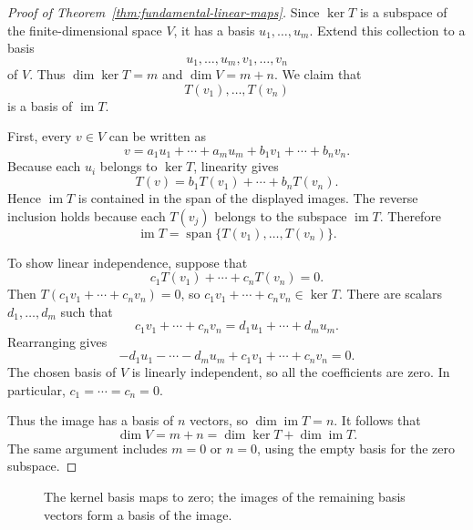 \begin{proof}[Proof of Theorem~\ref{thm:fundamental-linear-maps}]
  Since $\ker T$ is a subspace of the finite-dimensional space $V$,
  it has a basis $u_1,\ldots,u_m$. Extend this collection to a basis
  \[
    u_1,\ldots,u_m,v_1,\ldots,v_n
  \]
  of $V$. Thus $\dim\ker T=m$ and $\dim V=m+n$. We claim that
  \[
    T(v_1),\ldots,T(v_n)
  \]
  is a basis of $\operatorname{im}T$.

  First, every $v\in V$ can be written as
  \[
    v=a_1u_1+\cdots+a_mu_m+b_1v_1+\cdots+b_nv_n.
  \]
  Because each $u_i$ belongs to $\ker T$, linearity gives
  \[
    T(v)=b_1T(v_1)+\cdots+b_nT(v_n).
  \]
  Hence $\operatorname{im}T$ is contained in the span of the displayed
  images. The reverse inclusion holds because each $T(v_j)$ belongs
  to the subspace $\operatorname{im}T$. Therefore
  \[
    \operatorname{im}T
      =\operatorname{span}\{T(v_1),\ldots,T(v_n)\}.
  \]

  To show linear independence, suppose that
  \[
    c_1T(v_1)+\cdots+c_nT(v_n)=0.
  \]
  Then $T(c_1v_1+\cdots+c_nv_n)=0$, so
  $c_1v_1+\cdots+c_nv_n\in\ker T$. There are scalars
  $d_1,\ldots,d_m$ such that
  \[
    c_1v_1+\cdots+c_nv_n=d_1u_1+\cdots+d_mu_m.
  \]
  Rearranging gives
  \[
    -d_1u_1-\cdots-d_mu_m+c_1v_1+\cdots+c_nv_n=0.
  \]
  The chosen basis of $V$ is linearly independent, so all the
  coefficients are zero. In particular, $c_1=\cdots=c_n=0$.

  Thus the image has a basis of $n$ vectors, so
  $\dim\operatorname{im}T=n$. It follows that
  \[
    \dim V=m+n=\dim\ker T+\dim\operatorname{im}T.
  \]
  The same argument includes $m=0$ or $n=0$, using the empty basis
  for the zero subspace.
\end{proof}

\begin{figure}[htbp]
  \centering
  \caption{The kernel basis maps to zero; the images of the remaining
    basis vectors form a basis of the image.}
  \label{fig:rank-nullity-bases}
\end{figure}

